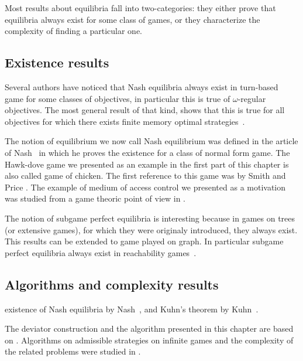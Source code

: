 Most results about equilibria fall into two-categories: they either prove
that equilibria always exist for some class of games, or they characterize
the complexity of finding a particular one.


\subsection*{Existence results}
Several authors have noticed that Nash equilibria always exist in turn-based
game for some classes of objectives, in particular this is true of
$\omega$-regular objectives.
The most general result of that kind, shows that this is true for all objectives
for which there exists finite memory optimal strategies~\cite{LeRoux&Pauly:2018}.

The notion of equilibrium we now call Nash equilibrium was
defined in the article of Nash~\cite{Nash:1950} in which he proves the
existence for a class of normal form game.
The Hawk-dove game we presented as an example in the first part of
this chapter is also called game of chicken.
The first reference to this game was by Smith and Price \cite{Smith&Price:1973}.
The example of medium of access control we presented as a motivation was
studied from a game theoric point of view in \cite{MacKenzie&Wicker:2003}.

The notion of subgame perfect equilibria is interesting because in games on
trees (or extensive games), for which they were originaly introduced, they
always exist. This results can be extended to game played on graph.
In particular subgame perfect equilibria always exist in reachability
games~\cite{Brihaye&Bruyere&DePril&Gimbert:2012}.

\subsection*{Algorithms and complexity results}

existence of Nash equilibria by Nash~\cite{Nash:1950,Nash:1951},
and Kuhn's theorem by Kuhn~\cite{Kuhn:1953}.

The deviator construction and the algorithm presented in this chapter are based on \cite{Bouyer&Brenguier&Markey&Ummels:2011,Brenguier:2012}.
Algorithms on admissible strategies on infinite games and the complexity of the related problems
were studied in
\cite{Berwanger:2007,Brenguier&Raskin&Sassolas:2014}.


